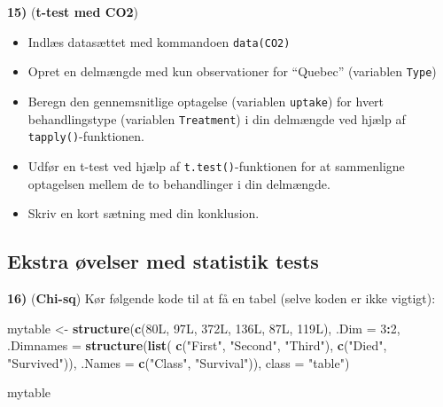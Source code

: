 \documentclass[
]{book}
\newenvironment{Shaded}{\begin{snugshade}}{\end{snugshade}}
\newcommand{\AttributeTok}[1]{\textcolor[rgb]{0.13,0.29,0.53}{#1}}
\newcommand{\DataTypeTok}[1]{\textcolor[rgb]{0.13,0.29,0.53}{#1}}
\newcommand{\DecValTok}[1]{\textcolor[rgb]{0.00,0.00,0.81}{#1}}
\newcommand{\FunctionTok}[1]{\textcolor[rgb]{0.13,0.29,0.53}{\textbf{#1}}}
\newcommand{\NormalTok}[1]{#1}
\newcommand{\OtherTok}[1]{\textcolor[rgb]{0.56,0.35,0.01}{#1}}
\newcommand{\SpecialCharTok}[1]{\textcolor[rgb]{0.81,0.36,0.00}{\textbf{#1}}}
\newcommand{\StringTok}[1]{\textcolor[rgb]{0.31,0.60,0.02}{#1}}
\providecommand{\tightlist}{%
  \setlength{\itemsep}{0pt}\setlength{\parskip}{0pt}}
\theoremstyle{definition}
\theoremstyle{definition}
\theoremstyle{definition}
\theoremstyle{definition}
\theoremstyle{remark}
\begin{document}
\textbf{15)} (\textbf{t-test med CO2})

\begin{itemize}
\tightlist
\item
  Indlæs datasættet med kommandoen \texttt{data(CO2)}
\item
  Opret en delmængde med kun observationer for ``Quebec'' (variablen \texttt{Type})
\item
  Beregn den gennemsnitlige optagelse (variablen \texttt{uptake}) for hvert behandlingstype (variablen \texttt{Treatment}) i din delmængde ved hjælp af \texttt{tapply()}-funktionen.
\item
  Udfør en t-test ved hjælp af \texttt{t.test()}-funktionen for at sammenligne optagelsen mellem de to behandlinger i din delmængde.
\item
  Skriv en kort sætning med din konklusion.
\end{itemize}

\subsection{Ekstra øvelser med statistik tests}\label{ekstra-uxf8velser-med-statistik-tests}

\textbf{16)} (\textbf{Chi-sq}) Kør følgende kode til at få en tabel (selve koden er ikke vigtigt):

\begin{Shaded}
\begin{Highlighting}[]
\NormalTok{mytable }\OtherTok{\textless{}{-}} \FunctionTok{structure}\NormalTok{(}\FunctionTok{c}\NormalTok{(}\DecValTok{80}\DataTypeTok{L}\NormalTok{, }\DecValTok{97}\DataTypeTok{L}\NormalTok{, }\DecValTok{372}\DataTypeTok{L}\NormalTok{, }\DecValTok{136}\DataTypeTok{L}\NormalTok{, }\DecValTok{87}\DataTypeTok{L}\NormalTok{, }\DecValTok{119}\DataTypeTok{L}\NormalTok{), }\AttributeTok{.Dim =} \DecValTok{3}\SpecialCharTok{:}\DecValTok{2}\NormalTok{, }\AttributeTok{.Dimnames =} \FunctionTok{structure}\NormalTok{(}\FunctionTok{list}\NormalTok{(}
    \FunctionTok{c}\NormalTok{(}\StringTok{"First"}\NormalTok{, }\StringTok{"Second"}\NormalTok{, }\StringTok{"Third"}\NormalTok{), }\FunctionTok{c}\NormalTok{(}\StringTok{"Died"}\NormalTok{, }\StringTok{"Survived"}\NormalTok{)), }\AttributeTok{.Names =} \FunctionTok{c}\NormalTok{(}\StringTok{"Class"}\NormalTok{, }\StringTok{"Survival"}\NormalTok{)), }\AttributeTok{class =} \StringTok{"table"}\NormalTok{)}

\NormalTok{mytable}
\end{Highlighting}
\end{Shaded}
\end{document}
